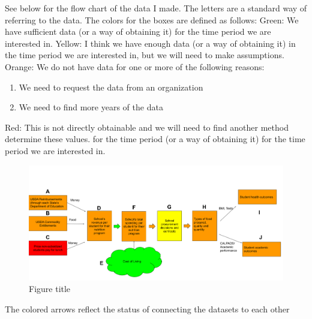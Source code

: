 \documentclass[12pt]{article}
\begin{document}
See below for the flow chart of the data I made. The letters are a standard way of referring to the data. The colors for the boxes are defined as follows:
Green: We have sufficient data (or a way of obtaining it) for the time period we are interested in.
Yellow: I think we have enough data (or a way of obtaining it) in the time period we are interested in, but we will need to make assumptions.
Orange: We do not have data for one or more of the following reasons:
\begin{enumerate}
	\item We need to request the data from an organization
	\item We need to find more years of the data
\end{enumerate}
Red: This is not directly obtainable and we will need to find another method determine these values.
for the time period (or a way of obtaining it) for the time period we are interested in.
\begin{figure}[tbh]
	\caption{Figure title}\label{fig1}
	\includegraphics[width=\linewidth, keepaspectratio]{"Data Flowchart, 4_17_2024.png"}
	
\end{figure}
The colored arrows reflect the status of connecting the datasets to each other
\end{document}
